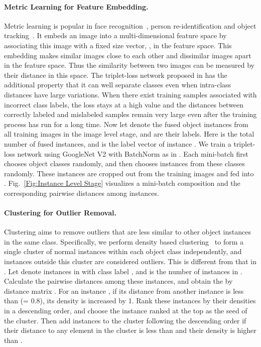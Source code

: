 \documentclass[10pt,twocolumn,letterpaper]{article}
\begin{document}
\paragraph{Metric Learning for Feature Embedding.} Metric learning is popular in face recognition~\cite{schroff2015facenet}, person re-identification and object tracking~\cite{schroff2015facenet,zheng2016person,tsagkatakis2011online}. It embeds an image  into a multi-dimensional feature space by associating this image with a fixed size vector, , in the feature space. This embedding makes similar images close to each other and dissimilar images apart in the feature space. Thus the similarity between two images can be measured by their distance in this space. The triplet-loss network  proposed in \cite{schroff2015facenet} has the additional property that it can well separate classes even when intra-class distances have large variations. When there exist training samples associated with incorrect class labels, the loss stays at a high value and the distances between correctly labeled and mislabeled samples remain very large even after the training process has run for a long time.
Now let  denote the fused object instances from all training images in the image level stage, and  are their labels. Here  is the total number of fused instances, and  is the label vector of instance . We train a triplet-loss network  using GoogleNet V2 with BatchNorm as in \cite{schroff2015facenet}. Each mini-batch first chooses  object classes randomly, and then chooses  instances from these classes randomly. These instances are cropped out from the training images and fed into . Fig.~\ref{Fig:Instance Level Stage} visualizes a mini-batch composition and the corresponding pairwise distances among instances.
\vspace{-4mm}
\paragraph{Clustering for Outlier Removal.} Clustering aims to remove outliers that are less similar to other object instances in the same class. Specifically, we perform density based clustering~\cite{rodriguez2014clustering} to form a single cluster of normal instances within each object class independently, and instances outside this cluster are considered outliers. This is different from that in \cite{rodriguez2014clustering}. Let  denote instances in  with class label , and  is the number of instances in . Calculate the pairwise distances  among these instances, and obtain the  by  distance matrix . For an instance , if its distance from another instance is less than  (= 0.8), its density  is increased by 1. Rank these instances by their densities in a descending order, and choose the instance ranked at the top as the seed of the cluster. Then add instances to the cluster following the descending order if their distance to any element in the cluster is less than  and their density is higher than .
\vspace{-4mm}
\end{document}
